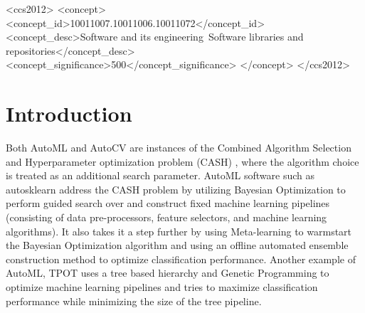 \documentclass[acmsmall,screen]{acmart}
\begin{document}
\begin{CCSXML}
<ccs2012>
<concept>
<concept_id>10011007.10011006.10011072</concept_id>
<concept_desc>Software and its engineering~Software libraries and repositories</concept_desc>
<concept_significance>500</concept_significance>
</concept>
</ccs2012>
\end{CCSXML}



\maketitle

\section{Introduction}



Both AutoML and AutoCV are instances of the Combined Algorithm Selection and Hyperparameter optimization problem (CASH) \cite{Feurer2019}, where the algorithm choice is treated as an additional search parameter. AutoML software such as autosklearn \cite{feurer-neurips15a} address the CASH problem by utilizing Bayesian Optimization to perform guided search over and construct fixed machine learning pipelines (consisting of data pre-processors, feature selectors, and machine learning algorithms). It also takes it a step further by using Meta-learning to warmstart the Bayesian Optimization algorithm and using an offline automated ensemble construction method to optimize classification performance. Another example of AutoML, TPOT \cite{le2020scaling}  uses a tree based hierarchy and Genetic Programming to optimize machine learning pipelines and tries to maximize classification performance while minimizing the size of the tree pipeline. 
\end{document}
